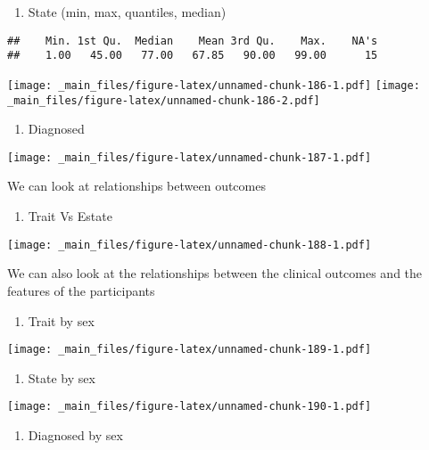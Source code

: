 \documentclass[
]{book}
\providecommand{\tightlist}{%
  \setlength{\itemsep}{0pt}\setlength{\parskip}{0pt}}
\begin{document}
\begin{enumerate}
\def\labelenumi{\alph{enumi}.}
\setcounter{enumi}{1}
\tightlist
\item
  State (min, max, quantiles, median)
\end{enumerate}

\begin{verbatim}
##    Min. 1st Qu.  Median    Mean 3rd Qu.    Max.    NA's 
##    1.00   45.00   77.00   67.85   90.00   99.00      15
\end{verbatim}

\texttt{[image: \_main\_files/figure-latex/unnamed-chunk-186-1.pdf]} \texttt{[image: \_main\_files/figure-latex/unnamed-chunk-186-2.pdf]}

\begin{enumerate}
\def\labelenumi{\alph{enumi}.}
\setcounter{enumi}{2}
\tightlist
\item
  Diagnosed
\end{enumerate}

\texttt{[image: \_main\_files/figure-latex/unnamed-chunk-187-1.pdf]}

We can look at relationships between outcomes

\begin{enumerate}
\def\labelenumi{\alph{enumi}.}
\setcounter{enumi}{3}
\tightlist
\item
  Trait Vs Estate
\end{enumerate}

\texttt{[image: \_main\_files/figure-latex/unnamed-chunk-188-1.pdf]}

We can also look at the relationships between the clinical outcomes and the features of the participants

\begin{enumerate}
\def\labelenumi{\alph{enumi}.}
\setcounter{enumi}{4}
\tightlist
\item
  Trait by sex
\end{enumerate}

\texttt{[image: \_main\_files/figure-latex/unnamed-chunk-189-1.pdf]}

\begin{enumerate}
\def\labelenumi{\alph{enumi}.}
\setcounter{enumi}{5}
\tightlist
\item
  State by sex
\end{enumerate}

\texttt{[image: \_main\_files/figure-latex/unnamed-chunk-190-1.pdf]}

\begin{enumerate}
\def\labelenumi{\alph{enumi}.}
\setcounter{enumi}{6}
\tightlist
\item
  Diagnosed by sex
\end{enumerate}
\end{document}
